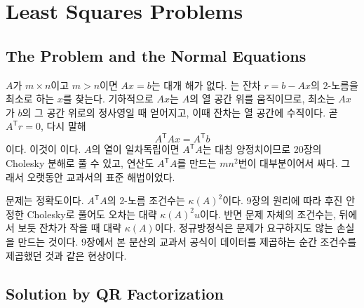 \chapter{Least Squares Problems}
\label{ch:least-squares}


\section{The Problem and the Normal Equations}
\label{sec:normal-equations}

$A$가 $m\times n$이고 $m>n$이면 $Ax=b$는 대개 해가 없다. 는 잔차 $r=b-Ax$의 2-노름을 최소로 하는 $x$를 찾는다. 기하적으로 $Ax$는 $A$의 열 공간 위를 움직이므로, 최소는 $Ax$가 $b$의 그 공간 위로의 정사영일 때 얻어지고, 이때 잔차는 열 공간에 수직이다. 곧 $A^{\mathsf T}r=0$, 다시 말해
\begin{equation}
\label{eq:normal}
A^{\mathsf T}Ax=A^{\mathsf T}b
\end{equation}
이다. 이것이 이다. $A$의 열이 일차독립이면 $A^{\mathsf T}A$는 대칭 양정치이므로 20장의 Cholesky 분해로 풀 수 있고, 연산도 $A^{\mathsf T}A$를 만드는 $mn^2$번이 대부분이어서 싸다. 그래서 오랫동안 교과서의 표준 해법이었다.

문제는 정확도이다. $A^{\mathsf T}A$의 2-노름 조건수는 $\kappa(A)^2$이다. 9장의 원리에 따라 후진 안정한 Cholesky로 풀어도 오차는 대략 $\kappa(A)^2u$이다. 반면 문제 자체의 조건수는, 뒤에서 보듯 잔차가 작을 때 대략 $\kappa(A)$이다. 정규방정식은 문제가 요구하지도 않는 손실을 만드는 것이다. 9장에서 본 분산의 교과서 공식이 데이터를 제곱하는 순간 조건수를 제곱했던 것과 같은 현상이다.

\section{Solution by QR Factorization}
\label{sec:ls-qr}

